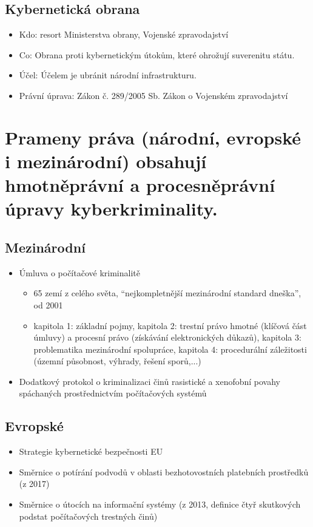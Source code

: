 \subsection{Kybernetická obrana}
\begin{itemize}
    \item Kdo: resort Ministerstva obrany, Vojenské zpravodajství
    \item Co: Obrana proti kybernetickým útokům, které ohrožují suverenitu státu.
    \item Účel: Účelem je ubránit národní infrastrukturu.
    \item Právní úprava: Zákon č. 289/2005 Sb. Zákon o Vojenském zpravodajství
\end{itemize}



\newpage
\section{Prameny práva (národní, evropské i mezinárodní) obsahují hmotněprávní a procesněprávní úpravy kyberkriminality.}

\subsection{Mezinárodní}
\begin{itemize}
    \item Úmluva o počítačové kriminalitě
    \begin{itemize}
        \item 65 zemí z celého světa, “nejkompletnější mezinárodní standard dneška”, od 2001
        \item kapitola 1: základní pojmy, kapitola 2: trestní právo hmotné (klíčová část úmluvy) a procesní právo (získávání elektronických důkazů), kapitola 3: problematika mezinárodní spolupráce, kapitola 4:  procedurální záležitosti (územní působnost, výhrady, řešení sporů,...)
    \end{itemize}
    \item Dodatkový protokol o kriminalizaci činů rasistické a xenofobní povahy spáchaných prostřednictvím počítačových systémů
\end{itemize}

\subsection{Evropské}

\begin{itemize}
    \item Strategie kybernetické bezpečnosti EU
    \item Směrnice o potírání podvodů v oblasti bezhotovostních platebních prostředků (z 2017)
    \item Směrnice o útocích na informační systémy (z 2013, definice čtyř skutkových podstat počítačových trestných činů)
\end{itemize}

